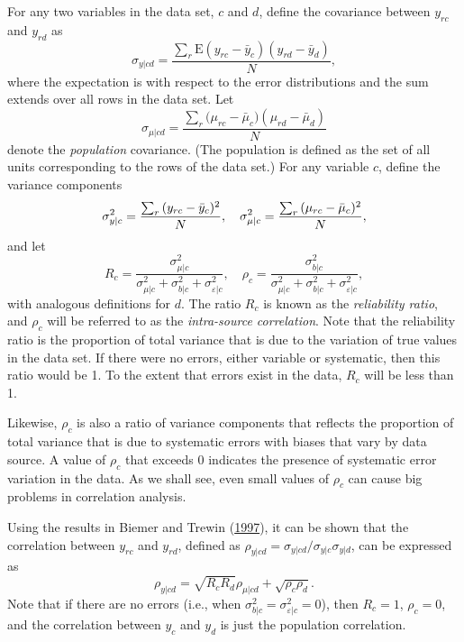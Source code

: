 \documentclass[]{krantz}
\begin{document}
For any two variables in the data set, \(c\) and \(d\), define the
covariance between \(y_{rc}\) and \(y_{rd}\) as \[\label{eq:10-1.6}
\sigma_{y\vert cd} = \frac{\sum\nolimits_r {\mbox{E}(y_{rc} -
\bar{y}_c )(y_{rd} - \bar {y}_d )} }{N},\] where the expectation is with
respect to the error distributions and the sum extends over all rows in
the data set. Let
\[\sigma_{\mu \vert cd} = \frac{\sum\nolimits_r {(\mu_{rc} - \bar{\mu
}_c } )(\mu_{rd} - \bar{\mu }_d )}{N}\] denote the \emph{population}
covariance. (The population is defined as the set of all units
corresponding to the rows of the data set.) For any variable \(c\),
define the variance components
\[\sigma_{y\vert c}^2 = \frac{\sum_r {(y_{rc} -
\bar{y}_c )^2}}{N},\quad \sigma_{\mu \vert c}^2 =\frac{%
\sum_r {(\mu_{rc} - \bar {\mu }_c } )^2}{N},\] and let \[R_c
= \frac{\sigma_{\mu \vert c}^2}{\sigma_{\mu \vert c}^2 +
\sigma_{b\vert c}^2 + \sigma_{\varepsilon \vert c}^2},\quad
\rho_c = \frac{\sigma_{b\vert c}^2}{\sigma_{\mu \vert c}^2 +
\sigma_{b\vert c}^2 + \sigma _{\varepsilon \vert c}^2},\] with analogous
definitions for \(d\). The ratio \(R_{c}\) is known as the
\emph{reliability ratio}, and \(\rho_c\) will be referred to as the
\emph{intra-source correlation}. Note that the reliability ratio is the
proportion of total variance that is due to the variation of true values
in the data set. If there were no errors, either variable or systematic,
then this ratio would be 1. To the extent that errors exist in the data,
\(R_{c}\) will be less than 1.

Likewise, \(\rho_c\) is also a ratio of variance components that
reflects the proportion of total variance that is due to systematic
errors with biases that vary by data source. A value of \(\rho_c\) that
exceeds 0 indicates the presence of systematic error variation in the
data. As we shall see, even small values of \(\rho_c\) can cause big
problems in correlation analysis.

Using the results in Biemer and Trewin
(\protect\hyperlink{ref-biemer1997review}{1997}), it can be shown that
the correlation between \(y_{rc}\) and \(y_{rd}\), defined as
\(\rho_{y\vert cd} = \sigma_{y\vert cd} / \sigma_{y\vert c} \sigma_{y\vert d}\),
can be expressed as
\[\label{eq:10-1.7} \rho_{y\vert cd} = \sqrt {R_c R_d } \rho_{\mu \vert cd} + \sqrt {\rho_c \rho_d }.\]
Note that if there are no errors (i.e., when
\(\sigma_{b\vert c}^2 = \sigma_{\varepsilon \vert c}^2 = 0\)), then
\(R_c = 1\), \(\rho_c =0\), and the correlation between \(y_{c}\) and
\(y_{d}\) is just the population correlation.
\end{document}
